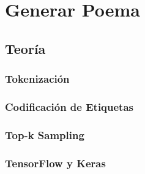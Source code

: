 \section{Generar Poema}

\subsection{Teoría}

\subsubsection*{Tokenización}



\subsubsection*{Codificación de Etiquetas}


\subsubsection*{Top-k Sampling}



\subsubsection*{TensorFlow y Keras}


